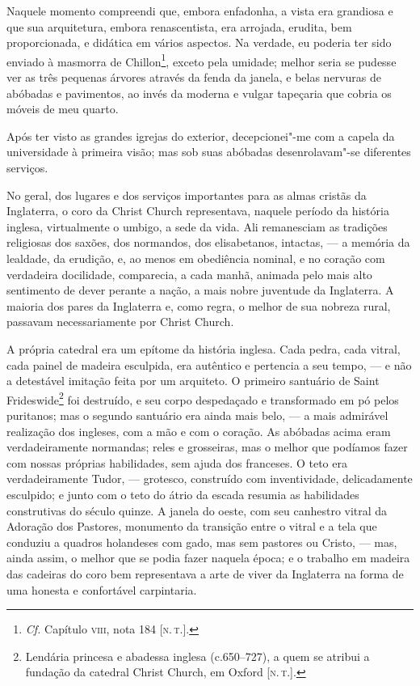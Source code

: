 Naquele momento compreendi que, embora enfadonha, a vista era grandiosa
e que sua arquitetura, embora renascentista, era arrojada, erudita, bem
proporcionada, e didática em vários aspectos. Na verdade, eu poderia ter
sido enviado à masmorra de Chillon\footnote{\emph{Cf.} Capítulo \textsc{viii},
  nota 184 {[}\textsc{n.\,t.}{]}.}, exceto pela umidade; melhor seria se
pudesse ver as três pequenas árvores através da fenda da janela, e belas
nervuras de abóbadas e pavimentos, ao invés da moderna e vulgar
tapeçaria que cobria os móveis de meu quarto.

Após ter visto as grandes igrejas do exterior, decepcionei"-me com a
capela da universidade à primeira visão; mas sob suas abóbadas
desenrolavam"-se diferentes serviços.

No geral, dos lugares e dos serviços importantes para as almas cristãs
da Inglaterra, o coro da Christ Church representava, naquele período da
história inglesa, virtualmente o umbigo, a sede da vida. Ali remanesciam
as tradições religiosas dos saxões, dos normandos, dos elisabetanos,
intactas, --- a memória da lealdade, da erudição, e, ao menos em
obediência nominal, e no coração com verdadeira docilidade, comparecia,
a cada manhã, animada pelo mais alto sentimento de dever perante a
nação, a mais nobre juventude da Inglaterra. A maioria dos pares da
Inglaterra e, como regra, o melhor de sua nobreza rural, passavam
necessariamente por Christ Church.

A própria catedral era um epítome da história inglesa. Cada pedra, cada
vitral, cada painel de madeira esculpida, era autêntico e pertencia a
seu tempo, --- e não a detestável imitação feita por um arquiteto. O
primeiro santuário de Saint Frideswide\footnote{Lendária princesa e
  abadessa inglesa (c.650--727), a quem se atribui a fundação da catedral
  Christ Church, em Oxford {[}\textsc{n.\,t.}{]}.} foi destruído, e seu corpo
despedaçado e transformado em pó pelos puritanos; mas o segundo
santuário era ainda mais belo, --- a mais admirável realização dos
ingleses, com a mão e com o coração. As abóbadas acima eram
verdadeiramente normandas; reles e grosseiras, mas o melhor que podíamos
fazer com nossas próprias habilidades, sem ajuda dos franceses. O teto
era verdadeiramente Tudor, --- grotesco, construído com inventividade,
delicadamente esculpido; e junto com o teto do átrio da escada resumia
as habilidades construtivas do século quinze. A janela do oeste, com seu
canhestro vitral da Adoração dos Pastores, monumento da transição entre
o vitral e a tela que conduziu a quadros holandeses com gado, mas sem
pastores ou Cristo, --- mas, ainda assim, o melhor que se podia fazer
naquela época; e o trabalho em madeira das cadeiras do coro bem
representava a arte de viver da Inglaterra na forma de uma honesta e
confortável carpintaria.

